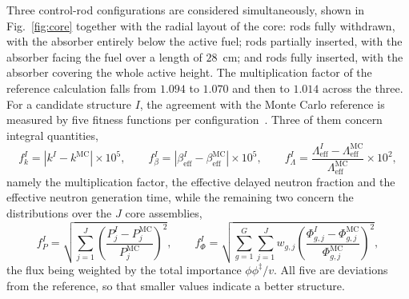 \documentclass{style/nseJournal}
\begin{document}
Three control-rod configurations are considered simultaneously, shown in
Fig.~\ref{fig:core} together with the radial layout of the core: rods fully
withdrawn, with the absorber entirely below the active fuel; rods partially
inserted, with the absorber facing the fuel over a length of $28$~cm; and rods
fully inserted, with the absorber covering the whole active height. The
multiplication factor of the reference calculation falls from $1.094$ to $1.070$
and then to $1.014$ across the three. For a candidate structure $I$, the agreement with
the Monte Carlo reference is measured by five fitness functions per
configuration~\cite{prevMulti}. Three of them concern integral quantities,
%
\begin{equation}
  f_k^I = \left|k^I - k^\mathrm{MC}\right|\times10^5, \qquad
  f_{\beta}^I = \left|\beta_\mathrm{eff}^I - \beta_\mathrm{eff}^\mathrm{MC}\right|
  \times10^5, \qquad
  f_{\Lambda}^I = \frac{\Lambda_\mathrm{eff}^I -
  \Lambda_\mathrm{eff}^\mathrm{MC}}{\Lambda_\mathrm{eff}^\mathrm{MC}}\times10^2,
  \label{eqn:integral}
\end{equation}
%
namely the multiplication factor, the effective delayed neutron fraction and the
effective neutron generation time, while the remaining two concern the
distributions over the $J$ core assemblies,
%
\begin{equation}
  f_P^I = \sqrt{\sum_{j=1}^{J}\left(\frac{P_j^I-P_j^\mathrm{MC}}
  {P_j^\mathrm{MC}}\right)^{2}}, \qquad
  f_{\Phi}^I = \sqrt{\sum_{g=1}^{G}\sum_{j=1}^{J} w_{g,j}
  \left(\frac{\Phi_{g,j}^I-\Phi_{g,j}^\mathrm{MC}}
  {\Phi_{g,j}^\mathrm{MC}}\right)^{2}},
  \label{eqn:distributed}
\end{equation}
%
the flux being weighted by the total importance $\phi\phi^{\ddagger}/v$. All
five are deviations from the reference, so that smaller values indicate a better
structure.
\end{document}
